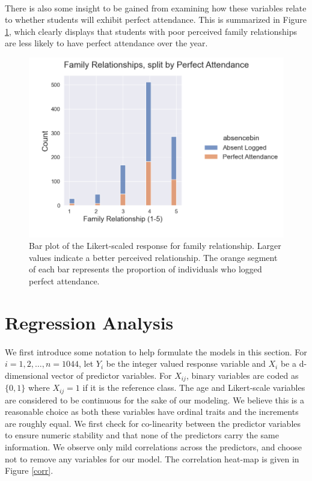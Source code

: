 \documentclass[12pt, titlepage]{article}
\begin{document}
	\paragraph{} There is also some insight to be gained from examining how these variables relate to whether students will exhibit perfect attendance. This is summarized in Figure \ref{famrel}, which clearly displays that students with poor perceived family relationships are less likely to have perfect attendance over the year. 
	
	\begin{figure}[h!]
	\centering
	\includegraphics[width = \textwidth]{fig/famrel.png}
	\caption{Bar plot of the Likert-scaled response for family relationship. Larger values indicate a better perceived relationship. The orange segment of each bar represents the proportion of individuals who logged perfect attendance.}
	\label{famrel}
	\end{figure}
	
	\section{Regression Analysis}
	\paragraph{} We first introduce some notation to help formulate the models in this section. For $i=1, 2, \dots, n = 1044$, let $Y_i$ be the integer valued response variable and $X_i$ be a d-dimensional vector of predictor variables. For $X_{ij}$, binary variables are coded as $\{0,1\}$ where $X_{ij} = 1$ if it is the reference class. The age and Likert-scale variables are considered to be continuous for the sake of our modeling. We believe this is a reasonable choice as both these variables have ordinal traits and the increments are roughly equal. We first check for co-linearity between the predictor variables to ensure numeric stability and that none of the predictors carry the same information. We observe only mild correlations across the predictors, and choose not to remove any variables for our model. The correlation heat-map is given in Figure \ref{corr}.
	
\end{document}
